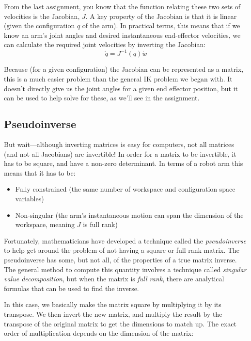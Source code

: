 \documentclass{16384_doc} %
\begin{document}
From the last assignment, you know that the function relating these two sets
of velocities is the Jacobian, $J$.  A key property of the Jacobian is that it is
linear (given the configuration $q$ of the arm).  In practical terms, this means
that if we know an arm’s joint angles and desired instantaneous end-effector
velocities, we can calculate the required joint velocities by inverting the
Jacobian:
\[
\dot q = J^{-1}(q) \dot w
\]

Because (for a given configuration) the Jacobian can be represented as a matrix, this is a much easier problem than the general IK problem we began with. It doesn't directly give us
the joint angles for a given end effector position, but it can be used to help
solve for these, as we'll see in the assignment.

\subsection{Pseudoinverse}

But wait---although inverting matrices is easy for computers, not all matrices
(and not all Jacobians) are invertible!  In order for a matrix to be invertible,
it has to be square, and have a non-zero determinant.  In terms of a robot arm
this means that it has to be:
\begin{itemize}
 \item Fully constrained (the same number of workspace and configuration space
  variables)
 \item Non-singular (the arm’s instantaneous motion can span the dimension of
  the workspace, meaning $J$ is full rank)
\end{itemize}

Fortunately, mathematicians have developed a technique called the
\emph{pseudoinverse} to help get around the problem of not having a square or
full rank matrix.  The pseudoinverse has some, but not all, of the properties of
a true matrix inverse.  The general method to compute this quantity involves
a technique called \emph{singular value decomposition}, but when the matrix is
\emph{full rank}, there are analytical formulas that can be used to find the inverse.

In this case, we basically make the matrix square by multiplying it by its
transpose.  We then invert the new matrix, and multiply the result by the
transpose of the original matrix to get the dimensions to match up. The exact
order of multiplication depends on the dimension of the matrix:
\end{document}
